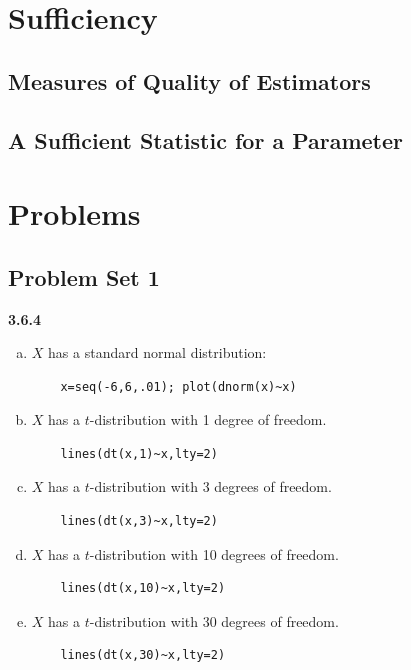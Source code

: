 \documentclass{book}
\theoremstyle{definition}
\begin{document}
\newpage



\chapter{Sufficiency}


\section{Measures of Quality of Estimators}

\section{A Sufficient Statistic for a Parameter}































\newpage


\chapter{Problems}


\newpage

\section{Problem Set 1}

\noindent \textbf{3.6.4}
\begin{enumerate}[(a)]
	\item $X$ has a standard normal distribution:
	\begin{lstlisting}
	x=seq(-6,6,.01); plot(dnorm(x)~x)
	\end{lstlisting}
	\item $X$ has a $t$-distribution with 1 degree of freedom.
	\begin{lstlisting}
	lines(dt(x,1)~x,lty=2)
	\end{lstlisting}
	\item $X$ has a $t$-distribution with 3 degrees of freedom.
	\begin{lstlisting}
	lines(dt(x,3)~x,lty=2)
	\end{lstlisting}
	\item $X$ has a $t$-distribution with 10 degrees of freedom.
	\begin{lstlisting}
	lines(dt(x,10)~x,lty=2)
	\end{lstlisting}
	\item $X$ has a $t$-distribution with 30 degrees of freedom.
	\begin{lstlisting}
	lines(dt(x,30)~x,lty=2)
	\end{lstlisting}
\end{enumerate}
\end{document}
